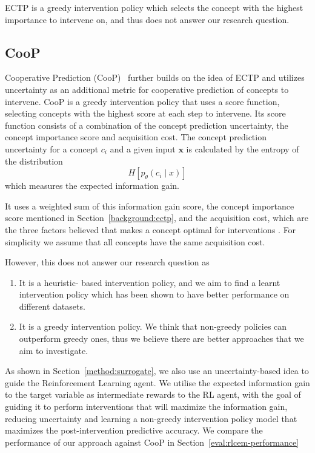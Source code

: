 ECTP is a greedy intervention policy which selects the 
concept with the highest importance to intervene on,
and thus does not answer our research question.

\subsection{CooP}\label{background:coop}
Cooperative Prediction (CooP)~\cite{coop} 
further builds on the idea of ECTP and utilizes
uncertainty as an additional metric for cooperative prediction of 
concepts to intervene.
CooP is a greedy intervention policy that 
uses a score function,
selecting concepts with the highest score at each step
to intervene.
Its score function consists of a combination of the concept prediction
uncertainty, the concept importance score and acquisition cost.
The concept prediction uncertainty for a concept $c_i$
and a given input $\mathbf{x}$ is calculated by the entropy
of the distribution
\[H [p_\theta(c_i \mid x)] \]
which measures the expected information gain.

It uses a weighted sum of this information gain score,
the concept importance score mentioned in Section~\ref{background:ectp},
and the acquisition cost, which are the three factors believed that 
makes a concept optimal for interventions
. For simplicity we assume that all concepts have the same acquisition cost.

However, this does not answer our research question as
\begin{enumerate}
    \item It is a heuristic-
    based intervention policy, and we aim to find a learnt intervention
    policy which has been shown to have better performance on different 
    datasets.
    \item It is a greedy intervention policy. We think that non-greedy
    policies can outperform greedy ones, thus we believe there are better
    approaches that we aim to investigate.
\end{enumerate}

As shown in Section~\ref{method:surrogate},
we also use an uncertainty-based
idea to guide the Reinforcement Learning agent.
We utilise the expected information gain to the target variable
as intermediate rewards to the RL agent, with the goal of guiding it to 
perform interventions that will maximize the information gain, reducing
uncertainty and learning a non-greedy intervention policy model
that maximizes the post-intervention predictive accuracy. We compare 
the performance of our approach against CooP in Section~\ref{eval:rlcem-performance}


